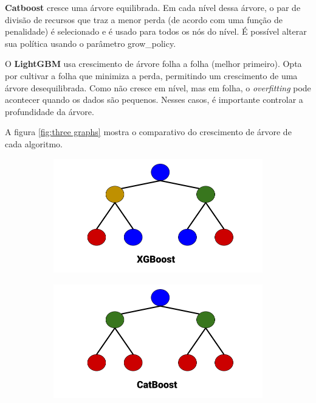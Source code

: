 \textbf{Catboost} cresce uma árvore equilibrada. Em cada nível dessa árvore, o par de divisão de recursos que traz a menor perda (de acordo com uma função de penalidade) é selecionado e é usado para todos os nós do nível. É possível alterar sua política usando o parâmetro grow\_policy.

O \textbf{LightGBM} usa crescimento de árvore folha a folha (melhor primeiro). Opta por cultivar a folha que minimiza a perda, permitindo um crescimento de uma árvore desequilibrada. Como não cresce em nível, mas em folha, o \textit{overfitting} pode acontecer quando os dados são pequenos. Nesses casos, é importante controlar a profundidade da árvore.

A figura \ref{fig:three graphs} mostra o comparativo do crescimento de árvore de cada algoritmo.

\begin{figure}[H]
     \centering
     \begin{subfigure}[b]{0.4\textwidth}
         \centering
         \includegraphics[width=\textwidth]{images/XGboost.png}
     \end{subfigure}
     \hfill
     \begin{subfigure}[b]{0.4\textwidth}
         \centering
         \includegraphics[width=\textwidth]{images/CatBoost.png}

\end{subfigure}
\end{figure}
